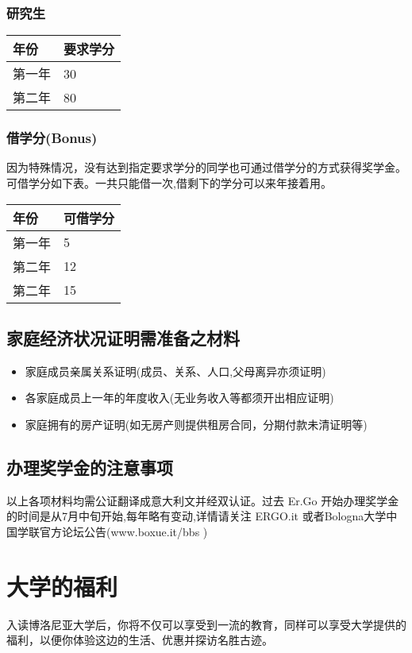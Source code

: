 \subsubsection{研究生}
\begin{tabularx}{\textwidth}{ |X|X| }
  \hline
  年份 & 要求学分\\
  \hline 
  第一年  & 30  \\
  第二年  & 80  \\
  \hline
\end{tabularx}


\subsubsection{借学分(Bonus)}
因为特殊情况，没有达到指定要求学分的同学也可通过借学分的方式获得奖学金。可借学分如下表。一共只能借一次,借剩下的学分可以来年接着用。\\
\begin{tabularx}{\textwidth}{ |X|X| }
  \hline
  年份 & 可借学分\\
  \hline 
  第一年  & 5  \\
  第二年  & 12  \\
  第二年  & 15  \\
  \hline
\end{tabularx}

\subsection{家庭经济状况证明需准备之材料}
\begin{itemize}
 \item 家庭成员亲属关系证明(成员、关系、人口,父母离异亦须证明)
 \item 各家庭成员上一年的年度收入(无业务收入等都须开出相应证明) 
 \item 家庭拥有的房产证明(如无房产则提供租房合同，分期付款未清证明等)
\end{itemize} 

\subsection{办理奖学金的注意事项}
以上各项材料均需公证翻译成意大利文并经双认证。过去 Er.Go 开始办理奖学金的时间是从7月中旬开始,每年略有变动,详情请关注 ERGO.it 或者Bologna大学中国学联官方论坛公告(www.boxue.it/bbs ) 


\section{大学的福利}
入读博洛尼亚大学后，你将不仅可以享受到一流的教育，同样可以享受大学提供的福利，以便你体验这边的生活、优惠并探访名胜古迹。

